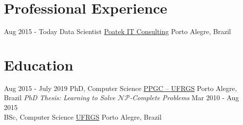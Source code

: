 \documentclass[letterpaper]{twentysecondcv} %
\begin{document}
\makeprofile %

\section{Professional Experience}

\begin{twenty} %
	\twentyitem
    	{Aug 2015 - Today}
        {Data Scientist}
        {\href{http://www.poatek.com}{Poatek IT Consulting}}
        {Porto Alegre, Brazil}
        {}
\end{twenty}

\section{Education}

\begin{twenty} %
	\twentyitem
    	{Aug 2015 - July 2019}
        {PhD, Computer Science}
        {\href{http://www.inf.ufrgs.br/ppgc/en/}{PPGC -- UFRGS}}
        {Porto Alegre, Brazil}
        {\textit{PhD Thesis: Learning to Solve $\mathcal{NP}$-Complete Problems}}
	\twentyitem
    	{Mar 2010 - Aug 2015\\}
        {BSc, Computer Science}
        {\href{http://www.ufrgs.br/}{UFRGS}}
        {Porto Alegre, Brazil}
        {}
\end{twenty}

\vspace{-2em}
\end{document}
